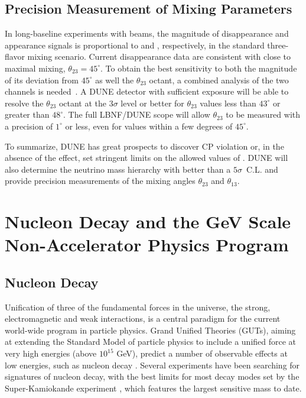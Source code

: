 \subsection{Precision Measurement of Mixing Parameters}

In long-baseline experiments with \numu beams, the
magnitude of \numu disappearance and \nue appearance signals is
proportional to  and ,
respectively, in the standard three-flavor mixing scenario.  Current
\numu disappearance data are consistent with close to maximal
mixing, $\theta_{23} = 45^\circ$.  To obtain the best sensitivity to
both the magnitude of its deviation from $45^\circ$ as well the 
$\theta_{23}$ octant, a combined analysis of the two channels
is needed~\cite{Huber:2010dx}.  A DUNE detector with sufficient exposure will be able to
resolve the $\theta_{23}$ octant at the $3\sigma$ level or better for
$\theta_{23}$ values less than $43^\circ$ or greater than $48^\circ$.
The full LBNF/DUNE scope will allow $\theta_{23}$ to be measured with a precision of
$1^\circ$ or less, even for values within a few degrees of
$45^\circ$. 

To summarize, DUNE has great prospects to discover CP violation or, in the absence of the
effect, set stringent limits on the allowed values of \deltacp. 
DUNE will also determine the neutrino mass hierarchy with better
than a $5\sigma$~C.L. and provide precision measurements
of the mixing angles $\theta_{23}$ and $\theta_{13}$.


\section{Nucleon Decay and the GeV Scale Non-Accelerator Physics Program}

\subsection{Nucleon Decay}

Unification of three of the fundamental forces in the universe, the strong, electromagnetic and weak interactions, is a central paradigm for the current world-wide program in particle physics. Grand Unified Theories (GUTs), aiming at extending the Standard Model of particle physics to include a unified force at very high energies  (above $10^{15}$ GeV), predict a number of observable effects at low energies, such as nucleon decay \cite{Pati:1973rp,Georgi:1974sy,Dimopoulos:1981dw,Langacker:1980js,deBoer:1994dg,Nath:2006ut}. Several experiments have been searching for signatures of nucleon decay, with the best limits for most decay modes set by the Super-Kamiokande experiment \cite{Nishino:2012bnw}, which features the largest sensitive mass to date. 

